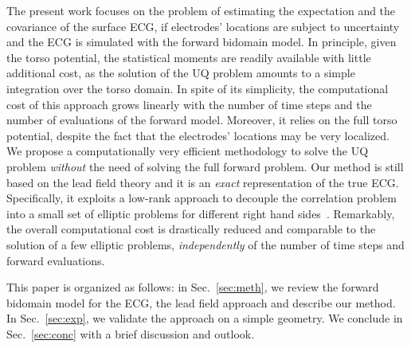 \documentclass[runningheads]{llncs}
\begin{document}
The present work focuses on the problem of estimating the expectation and
the covariance of the surface ECG, if electrodes' locations are subject to uncertainty
and the ECG is simulated with the forward bidomain model.
In principle, given the torso potential, the statistical moments are readily available
with little additional cost, as the solution of the UQ problem amounts
to a simple integration
over the torso domain.  In spite of its simplicity, the computational
cost of this approach grows linearly with the number of time steps and
the number of evaluations of the forward model. Moreover, it
relies on the full torso potential, despite the fact that the electrodes'
locations may be very localized.
We propose a computationally very efficient methodology to
solve the UQ problem \emph{without} the need of solving the full forward problem.
Our method is still based on the lead field theory and it is an
\emph{exact} representation of the true ECG. Specifically,
it exploits a low-rank approach
to decouple the correlation problem into a small set of elliptic
problems for different right hand sides~\cite{HL13}.
Remarkably, the overall computational cost is drastically reduced
and comparable to the solution of a few
elliptic problems, \emph{independently} of the number of time steps and forward
evaluations.

This paper is organized as follows: in Sec.~\ref{sec:meth},
we review the forward bidomain model for the ECG,
the lead field approach and describe our method.
In Sec.~\ref{sec:exp}, we validate the approach on a simple geometry.
We conclude in Sec.~\ref{sec:conc} with a brief discussion and outlook.

\end{document}
